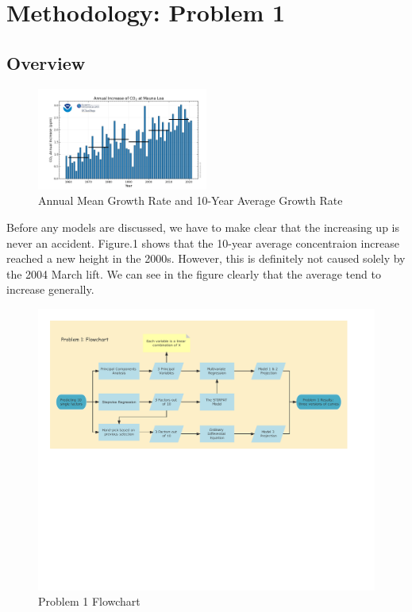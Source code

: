 \documentclass[12pt]{article}
\begin{document}
\section{Methodology: Problem 1}
\label{method:1}

\subsection{Overview}

\begin{figure}[hbt]
    \centering
    \includegraphics[width = 0.5\textwidth]{fig/co2_data_mlo.png}
    \caption{ Annual Mean Growth Rate and 10-Year Average Growth Rate}
    \label{p2004}
\end{figure}

Before any models are discussed, we have to make clear that the  increasing up is never an accident. Figure.1 shows that the 10-year average  concentraion increase reached a new height in the 2000s. However, this is definitely not caused solely by the 2004 March lift\cite{ref3}.  We can see in the figure clearly that the average tend to increase generally. 

\begin{figure}[hbt]
\centering
\includegraphics[width = \textwidth]{fig/p1_flowchart.pdf}
\caption{Problem 1 Flowchart}
\label{p1flowchart}
\end{figure}
\end{document}
